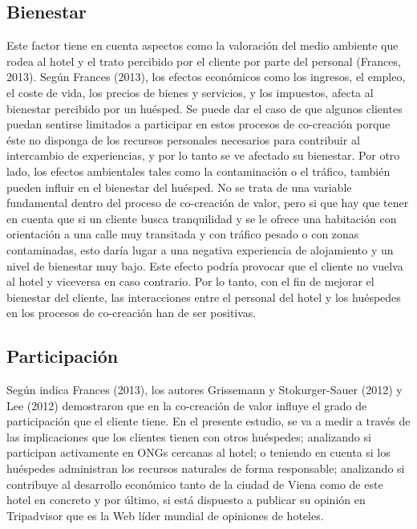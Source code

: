 \subsection{Bienestar}

Este factor tiene en cuenta aspectos como la valoración del medio ambiente que rodea al hotel y el trato percibido por el cliente por parte del personal (Frances, 2013). Según Frances (2013), los efectos económicos como los ingresos, el empleo, el coste de vida, los precios de bienes y servicios, y los impuestos, afecta al bienestar percibido por un huésped. Se puede dar el caso de que algunos clientes puedan sentirse limitados a participar en estos procesos de co-creación porque éste no disponga de los recursos personales necesarios para contribuir al intercambio de experiencias, y por lo tanto se ve afectado su bienestar. Por otro lado, los efectos ambientales tales como la contaminación o el tráfico, también pueden influir en el bienestar del huésped. No se trata de una variable fundamental dentro del proceso de co-creación de valor, pero si que hay que tener en cuenta que si un cliente busca tranquilidad y se le ofrece una habitación con orientación a una calle muy transitada y con tráfico pesado o con zonas contaminadas, esto daría lugar a una negativa experiencia de alojamiento y un nivel de bienestar muy bajo. Este efecto podría provocar que el cliente no vuelva al hotel y viceversa en caso contrario. Por lo tanto, con el fin de mejorar el bienestar del cliente, las interacciones entre el personal del hotel y los huéspedes en los procesos de co-creación han de ser positivas.

\subsection{Participación}

Según indica Frances (2013), los autores Grissemann y Stokurger-Sauer (2012) y Lee (2012) demostraron que en la co-creación de valor influye el grado de participación que el cliente tiene. En el presente estudio, se va a medir a través de las implicaciones que los clientes tienen con otros huéspedes; analizando si participan activamente en ONGs cercanas al hotel; o teniendo en cuenta si los huéspedes administran los recursos naturales de forma responsable; analizando si contribuye al desarrollo económico tanto de la ciudad de Viena como de este hotel en concreto y por último, si está dispuesto a publicar su opinión en Tripadvisor que es la Web líder mundial de opiniones de hoteles.

